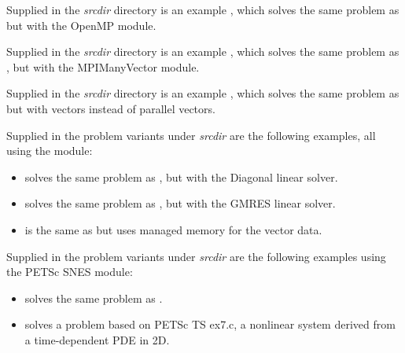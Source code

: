 \vspace{0.2in}\noindent Supplied in the
{\em srcdir} directory is an example
, which solves the same problem as
 but with the OpenMP {\nvector} module.

\vspace{0.2in}\noindent Supplied in the
{\em srcdir} directory is an example
, which solves the same problem as
, but with the MPIManyVector module.

\vspace{0.2in}\noindent Supplied in the
{\em srcdir} directory is an example
, which solves the same problem as
 but with {\hypre} vectors instead of
{\sundials} parallel vectors.

\vspace{0.2in}\noindent Supplied in the problem variants under
{\em srcdir} are the following examples, all using
the  {\nvector} module:
\begin{itemize}
\item {} solves the same problem as
  , but with the Diagonal linear solver.
\item {} solves the same problem as
  , but with the GMRES linear solver.
\item {} is the same as
   but uses managed memory for the vector data.
\end{itemize}

\vspace{0.2in}\noindent Supplied in the problem variants under
{\em srcdir} are the following examples using the
PETSc SNES module:
\begin{itemize}
\item {} solves the same problem as
  .
\item {} solves a problem based on PETSc TS ex7.c, a
  nonlinear system derived from a time-dependent PDE in 2D.
\end{itemize}

